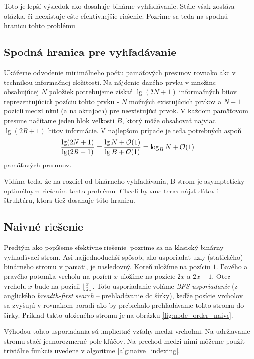 Toto je lepší výsledok ako dosahuje binárne vyhľadávanie. Stále však zostáva otázka, či neexistuje  ešte efektívnejšie riešenie. Pozrime sa teda na spodnú hranicu tohto problému.

\subsection{Spodná hranica pre vyhľadávanie} \label{sec:tree-lowerbound}
Ukážeme odvodenie minimálneho počtu pamäťových presunov rovnako ako v \citep{demaineoverview} technikou informačnej zložitosti. Na nájdenie daného prvku v množine obsahujúcej $N$ položiek potrebujeme získať $\lg(2N+1)$ informačných bitov reprezentujúcich pozíciu tohto prvku - $N$ možných existujúcich prvkov a $N+1$ pozícií medzi nimi (a na okrajoch) pre neexistujúci prvok. V každom pamäťovom presune načítame jeden blok veľkosti $B$, ktorý môže obsahovať najviac $\lg(2B+1)$ bitov informácie. V najlepšom prípade je teda potrebných aspoň
\[
\frac{\lg(2N+1)}{\lg(2B+1)} = \frac{\lg N + \mathcal{O}(1)}{\lg B + \mathcal{O}(1)} = \log_B{N} + \mathcal{O}(1)
\]
pamäťových presunov. 

Vidíme teda, že na rozdiel od \obliv binárneho vyhľadávania, \aware B-strom je asymptoticky optimálnym riešením tohto problému. Chceli by sme teraz nájsť \obliv dátovú štruktúru, ktorá tiež dosahuje túto hranicu.

\subsection{Naivné \obliv riešenie} \label{sec:static-naive}
Predtým ako popíšeme efektívne \obliv riešenie, pozrime sa na klasický binárny vyhľadávací strom. Asi najjednoduchší spôsob, ako usporiadať uzly (statického) binárneho stromu v pamäti, je nasledovný. Koreň uložíme na pozíciu $1$. Ľavého a pravého potomka vrcholu na pozícii $x$ uložíme na pozície $2x$ a $2x+1$. Otec vrcholu $x$ bude na pozícii $\lfloor\frac{x}{2}\rfloor$. Toto usporiadanie voláme \emph{BFS usporiadanie} (z anglického \emph{breadth-first search} -- prehľadávanie do šírky), keďže pozície vrcholov sa zvyšujú v rovnakom poradí ako by prebiehalo prehľadávanie tohto stromu do šírky. Príklad takto uloženého stromu je na obrázku \ref{fig:node_order_naive}.

Výhodou tohto usporiadania sú implicitné vzťahy medzi vrcholmi. Na udržiavanie stromu stačí jednorozmerné pole kľúčov. Na prechod medzi nimi môžeme použiť triviálne funkcie uvedene v algoritme \ref{alg:naive_indexing}. 

